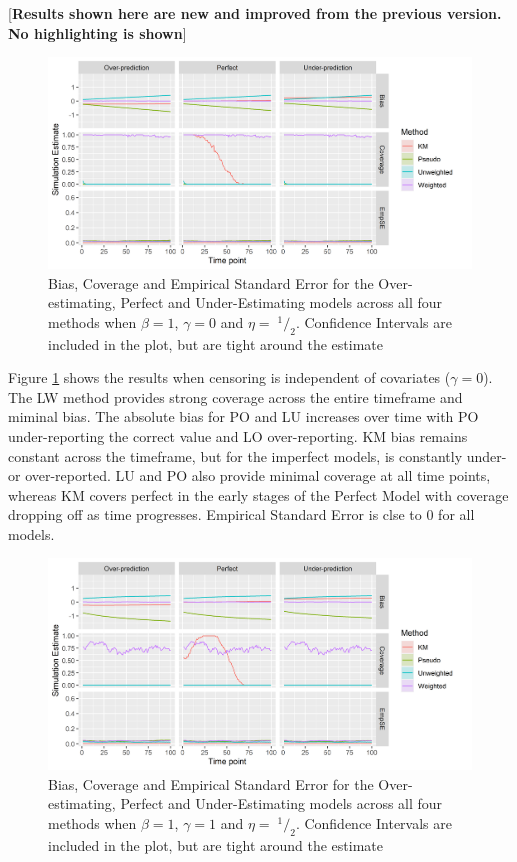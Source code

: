 \documentclass[12pt,PhD,twoside,openright]{muthesis}
\newcommand{\sfrac}[2]{\;^{#1}/_{#2}}
\begin{document}
{[}\textbf{Results shown here are new and improved from the previous version. No highlighting is shown}{]}
\begin{figure}
\includegraphics[width=54.68in]{figure/IPCW_Logistic/MainPlot_b(1)_g(0)_e(0.5)} \caption{Bias, Coverage and Empirical Standard Error for the Over-estimating, Perfect and Under-Estimating models across all four methods when $\beta=1$, $\gamma=0$ and $\eta=\sfrac{1}{2}$. Confidence Intervals are included in the plot, but are tight around the estimate}\label{fig:MainPlotg0}
\end{figure}
Figure \ref{fig:MainPlotg0} shows the results when censoring is independent of covariates (\(\gamma=0\)). The LW method provides strong coverage across the entire timeframe and miminal bias. The absolute bias for PO and LU increases over time with PO under-reporting the correct value and LO over-reporting. KM bias remains constant across the timeframe, but for the imperfect models, is constantly under- or over-reported. LU and PO also provide minimal coverage at all time points, whereas KM covers perfect in the early stages of the Perfect Model with coverage dropping off as time progresses. Empirical Standard Error is clse to 0 for all models.
\begin{figure}
\includegraphics[width=54.68in]{figure/IPCW_Logistic/MainPlot_b(1)_g(1)_e(0.5)} \caption{Bias, Coverage and Empirical Standard Error for the Over-estimating, Perfect and Under-Estimating models across all four methods when $\beta=1$, $\gamma=1$ and $\eta=\sfrac{1}{2}$. Confidence Intervals are included in the plot, but are tight around the estimate}\label{fig:MainPlotg1}
\end{figure}
\end{document}
